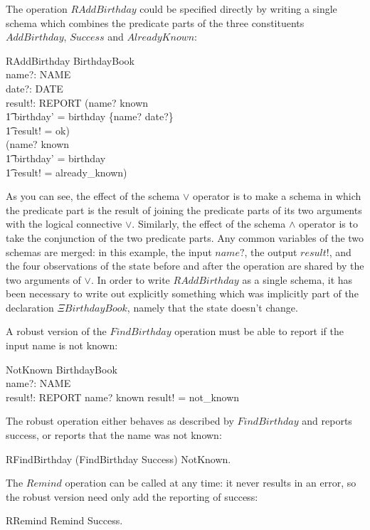 \documentclass[12pt]{article}
\begin{document}
The operation $RAddBirthday$ could be specified directly by writing
a single schema which combines the predicate parts of the three
constituents $AddBirthday$, $Success$ and $AlreadyKnown$:
\begin{schema}{RAddBirthday}
	\Delta BirthdayBook \\
	name?: NAME \\
	date?: DATE \\
	result!: REPORT
\where
	(name? \notin known \land \\
\t1		birthday' = birthday \cup \{name? \mapsto date?\} \land \\
\t1		result! = ok) \lor \\
	(name? \in known \land \\
\t1		birthday' = birthday \land \\
\t1		result! = already\_known)
\end{schema}
As you can see, the effect of the schema $\lor$ operator is to make a schema
in which the predicate part is the result of joining the predicate parts of
its two arguments with the logical connective $\lor$. Similarly, the effect
of the schema $\land$ operator is to take the conjunction of the two
predicate parts.
Any common variables of the two schemas are merged: in this example, the
input $name?$, the output $result!$, and the four observations of the
state before and after the operation are shared by the two arguments of
$\lor$.
In order to write $RAddBirthday$ as a single schema, it has been necessary
to write out explicitly something which was implicitly part of the declaration
$\Xi BirthdayBook$, namely that the state doesn't change.

A robust version of the $FindBirthday$ operation must be able to report
if the input name is not known:
\begin{schema}{NotKnown}
	\Xi BirthdayBook \\
	name?: NAME \\
	result!: REPORT
\where
	name? \notin known
\also
	result! = not\_known
\end{schema}
The robust operation either behaves as described by $FindBirthday$ and
reports success, or reports that the name was not known:
\begin{zed}
	RFindBirthday  (FindBirthday \land Success) \lor NotKnown.
\end{zed}
The $Remind$ operation can be called at any time: it never results in
an error, so the robust version need only add the reporting of success:
\begin{zed}
	RRemind  Remind \land Success.
\end{zed}
\end{document}
